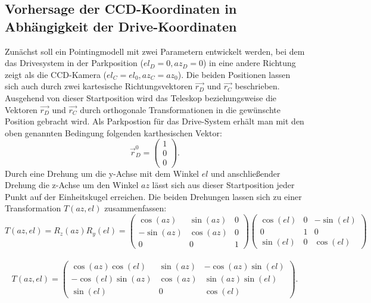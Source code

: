 \subsection{Vorhersage der CCD-Koordinaten in Abhängigkeit der Drive-Koordinaten}
Zunächst soll ein Pointingmodell mit zwei Parametern entwickelt werden, bei dem das Drivesystem in der Parkposition ($el_D=0,az_D=0$) in eine andere Richtung zeigt als die CCD-Kamera ($el_C=el_0,az_C=az_0$). Die beiden Positionen lassen sich auch durch zwei kartesische Richtungsvektoren $\vec{r_D}$ und $\vec{r_C}$ beschrieben. Ausgehend von dieser Startposition wird das Teleskop beziehungsweise die Vektoren $\vec{r_D}$ und $\vec{r_C}$ durch orthogonale Transformationen in die gewünschte Position gebracht wird. Als Parkpostion für das Drive-System erhält man mit den oben genannten Bedingung folgenden karthesischen Vektor:
\begin{equation}
\vec{r}_D^0=\left(\begin{array}{c} 1 \\ 0 \\ 0 \end{array}\right).
\label{eq:startDrive}
\end{equation}
Durch eine Drehung um die y-Achse mit dem Winkel $el$ und anschließender Drehung die z-Achse um den Winkel $az$ lässt sich aus dieser Startposition jeder Punkt auf der Einheitskugel erreichen. Die beiden Drehungen lassen sich zu einer Transformation $T(az,el)$ zusammenfassen:
\begin{equation}
T(az,el)=R_z(az)R_y(el)=
\left(\begin{array}{ccc} \cos(az) & \sin(az) & 0 \\ -\sin(az) & \cos(az) & 0 \\ 0 & 0 & 1\end{array}\right)
\left(\begin{array}{ccc} \cos(el) & 0 &-\sin(el) \\0 & 1 & 0\\ \sin(el) & 0 & \cos(el) \end{array} \right)
\end{equation}\\
\begin{equation}
T(az,el)=\left(\begin{array}{ccc} \cos(az)\cos(el) & \sin(az) &-\cos(az)\sin(el) \\-\cos(el)\sin(az) & \cos(az) & \sin(az)\sin(el)\\ \sin(el) & 0 & \cos(el) \end{array} \right).
\label{eq:TransformMat}
\end{equation}\\
